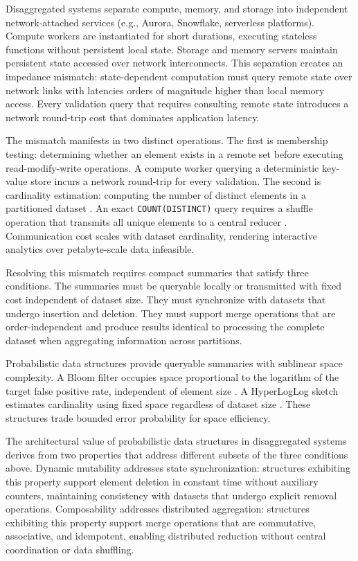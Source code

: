 Disaggregated systems separate compute, memory, and storage into independent network-attached services (e.g., Aurora, Snowflake, serverless platforms). Compute workers are instantiated for short durations, executing stateless functions without persistent local state. Storage and memory servers maintain persistent state accessed over network interconnects. This separation creates an impedance mismatch: state-dependent computation must query remote state over network links with latencies orders of magnitude higher than local memory access. Every validation query that requires consulting remote state introduces a network round-trip cost that dominates application latency.

The mismatch manifests in two distinct operations. The first is membership testing: determining whether an element exists in a remote set before executing read-modify-write operations. A compute worker querying a deterministic key-value store incurs a network round-trip for every validation. The second is cardinality estimation: computing the number of distinct elements in a partitioned dataset \cite{Harmouch2017CardinalityEA}. An exact \texttt{COUNT(DISTINCT)} query requires a shuffle operation that transmits all unique elements to a central reducer \cite{Zaharia2012ResilientDD}. Communication cost scales with dataset cardinality, rendering interactive analytics over petabyte-scale data infeasible.

Resolving this mismatch requires compact summaries that satisfy three conditions. The summaries must be queryable locally or transmitted with fixed cost independent of dataset size. They must synchronize with datasets that undergo insertion and deletion. They must support merge operations that are order-independent and produce results identical to processing the complete dataset when aggregating information across partitions.

Probabilistic data structures provide queryable summaries with sublinear space complexity. A Bloom filter occupies space proportional to the logarithm of the target false positive rate, independent of element size \cite{Bloom1970SpacetimeTI}. A HyperLogLog sketch estimates cardinality using fixed space regardless of dataset size \cite{Flajolet2007HyperLogLogTA}. These structures trade bounded error probability for space efficiency.

The architectural value of probabilistic data structures in disaggregated systems derives from two properties that address different subsets of the three conditions above. Dynamic mutability addresses state synchronization: structures exhibiting this property support element deletion in constant time without auxiliary counters, maintaining consistency with datasets that undergo explicit removal operations. Composability addresses distributed aggregation: structures exhibiting this property support merge operations that are commutative, associative, and idempotent, enabling distributed reduction without central coordination or data shuffling.

